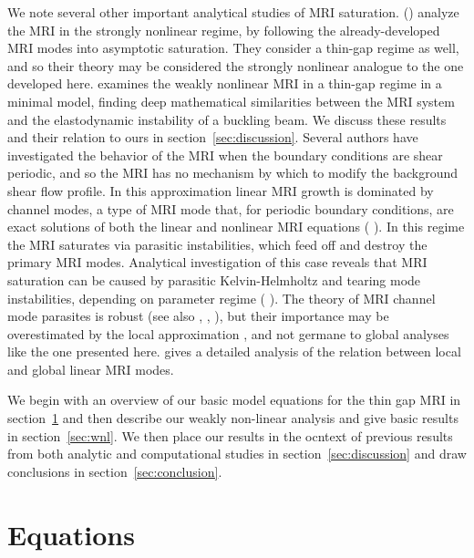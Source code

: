 \documentclass{emulateapj}
\newcommand{\citei}[1]{\citeauthor{#1} \citeyear{#1}}
\begin{document}
We note several other important analytical studies of MRI saturation. \citeauthor{Knobloch:2005ba} (\citeyear{Knobloch:2005ba}) analyze the MRI in the strongly nonlinear regime, by following the already-developed MRI modes into asymptotic saturation. They consider a thin-gap regime as well, and so their theory may be considered the strongly nonlinear analogue to the one developed here. \citei{Vasil:2015} examines the weakly nonlinear MRI in a thin-gap regime in a minimal model, finding deep mathematical similarities between the MRI system and the elastodynamic instability of a buckling beam. We discuss these results and their relation to ours in section~\ref{sec:discussion}. Several authors have investigated the behavior of the MRI when the boundary conditions are shear periodic, and so the MRI has no mechanism by which to modify the background shear flow profile. In this approximation linear MRI growth is dominated by channel modes, a type of MRI mode that, for periodic boundary conditions, are exact solutions of both the linear and nonlinear MRI equations (\citei{Goodman:1994ul}). In this regime the MRI saturates via parasitic instabilities, which feed off and destroy the primary MRI modes. Analytical investigation of this case reveals that MRI saturation can be caused by parasitic Kelvin-Helmholtz and tearing mode instabilities, depending on parameter regime (\citei{Pessah:2010ic}). The theory of MRI channel mode parasites is robust (see also \citei{Pessah:2009gm}, \citei{Latter:2010iz}, \citei{Rembiasz:2016}), but their importance may be overestimated by the local approximation \citep{Latter:2015}, and not germane to global analyses like the one presented here. \citet{Latter:2015} gives a detailed analysis of the relation between local and global linear MRI modes. 

We begin with an overview of our basic model equations for the thin gap MRI in section~\ref{sec:equations} and then describe our weakly non-linear analysis and give basic results in section~\ref{sec:wnl}. We then place our results in the ocntext of previous results from both analytic and computational studies in section~\ref{sec:discussion} and draw conclusions in section~\ref{sec:conclusion}.


\section{Equations}\label{sec:equations}
\end{document}
